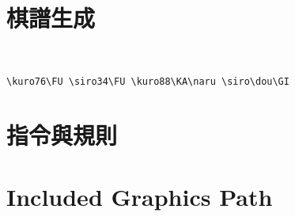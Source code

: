 \documentclass[a4paper, 10pt,]{article}
\begin{document}
\newpage
\section{棋譜生成}


\FU {}\FU {}\KA\naru {}\dou\GI\\



\begin{lstlisting}
\kuro76\FU \siro34\FU \kuro88\KA\naru \siro\dou\GI
\end{lstlisting}

\section{指令與規則}

\section{Included Graphics Path}
\end{document}
